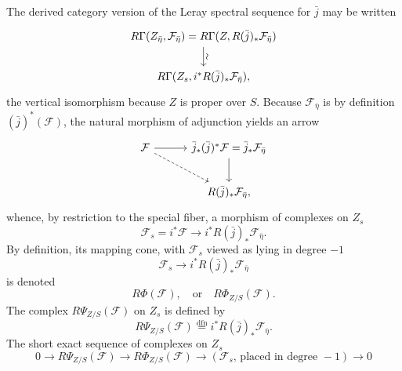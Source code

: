 \kmitem\label{item:14.1.2}
The derived category version of the Leray spectral sequence for $\bar{j}$ may be written
\begin{equation}\label{eq:14.1.2.1}
\begin{tikzcd}[row sep=1.8em]
R\Gamma(Z_{\bar{\eta}}, \mathcal{F}_{\bar{\eta}}) = R\Gamma(Z, R(\bar{j})_* \mathcal{F}_{\bar{\eta}}) \arrow[d, "\rotatebox{90}{$\sim$}"] \\
R\Gamma(Z_s, i^* R(\bar{j})_* \mathcal{F}_{\bar{\eta}}) ,
\end{tikzcd}
\end{equation}
the vertical isomorphism because $Z$ is proper over $S$. Because $\mathcal{F}_{\bar{\eta}}$ is by definition $(\bar{j})^*(\mathcal{F})$, the natural morphism of adjunction yields an arrow
\begin{equation}\label{eq:14.1.2.2}
\begin{tikzcd}[row sep=2.2em, column sep=3em]
\mathcal{F} \arrow[r] \arrow[dr, dashed] & \bar{j}_* (\bar{j})^* \mathcal{F} = \bar{j}_* \mathcal{F}_{\bar{\eta}} \arrow[d] \\
& R(\bar{j})_* \mathcal{F}_{\bar{\eta}} ,
\end{tikzcd}
\end{equation}
whence, by restriction to the special fiber, a morphism of complexes on $Z_s$
\begin{equation}\label{eq:14.1.2.3}
\mathcal{F}_s = i^* \mathcal{F} \to i^* R(\bar{j})_* \mathcal{F}_{\bar{\eta}} .
\end{equation}
By definition, its mapping cone, with $\mathcal{F}_s$ viewed as lying in degree $-1$
\begin{equation}\label{eq:14.1.2.4}
\mathcal{F}_s \to i^* R(\bar{j})_* \mathcal{F}_{\bar{\eta}}
\end{equation}
is denoted
\begin{equation}\label{eq:14.1.2.5}
R\Phi(\mathcal{F}), \quad\text{or}\quad R\Phi_{Z/S}(\mathcal{F}) .
\end{equation}
The complex $R\Psi_{Z/S}(\mathcal{F})$ on $Z_s$ is defined by
\begin{equation}\label{eq:14.1.2.6}
R\Psi_{Z/S}(\mathcal{F}) \overset{\mathrm{dfn}}{=} i^* R(\bar{j})_* \mathcal{F}_{\bar{\eta}} .
\end{equation}
The short exact sequence of complexes on $Z_s$
\begin{equation}\label{eq:14.1.2.7}
0 \to R\Psi_{Z/S}(\mathcal{F}) \to R\Phi_{Z/S}(\mathcal{F}) \to (\mathcal{F}_s \text{, placed in degree } -1) \to 0
\end{equation}

